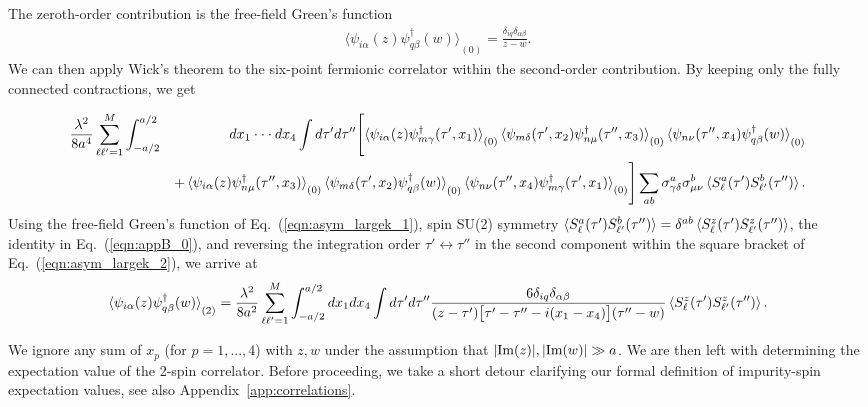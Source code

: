 \documentclass[aps,prb,twocolumn,superscriptaddress]{revtex4-1}
\begin{document}
The zeroth-order contribution is the free-field Green's function
\begin{eqnarray}
\bigl\langle{\psi_{i\alpha}(z)\psi_{q\beta}^{\dagger}(w)\bigr\rangle}_{(0)}=\frac{\delta_{iq}\delta_{\alpha\beta}}{z-w}. \label{eqn:asym_largek_1}
\end{eqnarray}
We can then apply Wick's theorem to the six-point fermionic correlator within the second-order contribution. By keeping only the fully connected contractions, we get 
\begin{widetext}
\begin{eqnarray}
\frac{\lambda^{2}}{8a^{4}}\sum_{\ell\ell'=1}^{M}\int_{-a/2}^{a/2}&&dx_{1}\cdot\cdot\cdot dx_{4}\int{d\tau'd\tau''}\Biggl[\braket{\psi_{i\alpha}(z)\psi_{m\gamma}^{\dagger}(\tau',x_{1})}_{(0)}\braket{\psi_{m\delta}(\tau',x_{2})\psi_{n\mu}^{\dagger}(\tau'',x_{3})}_{(0)}\braket{\psi_{n\nu}(\tau'',x_{4})\psi_{q\beta}^{\dagger}(w)}_{(0)} \label{eqn:asym_largek_2} \\
&&+\braket{\psi_{i\alpha}(z)\psi_{n\mu}^{\dagger}(\tau'',x_{3})}_{(0)}\braket{\psi_{m\delta}(\tau',x_{2})\psi_{q\beta}^{\dagger}(w)}_{(0)}\braket{\psi_{n\nu}(\tau'',x_{4})\psi_{m\gamma}^{\dagger}(\tau',x_{1})}_{(0)}\Biggr]\sum_{ab}\sigma^{a}_{\gamma\delta}\sigma^{b}_{\mu\nu}\braket{S_{\ell}^{a}(\tau')S_{\ell'}^{b}(\tau'')}. \nonumber
\end{eqnarray}
Using the free-field Green's function of Eq.~(\ref{eqn:asym_largek_1}), spin SU(2) symmetry $\braket{S_{\ell}^{a}(\tau')S_{\ell'}^{b}(\tau'')}=\delta^{ab} \braket{S_{\ell}^{z}(\tau')S_{\ell'}^{z}(\tau'')}$, the identity in Eq.~(\ref{eqn:appB_0}), and reversing the integration order $\tau'\leftrightarrow\tau''$ in the second component within the square bracket of Eq.~(\ref{eqn:asym_largek_2}), we arrive at
\begin{eqnarray}
\braket{\psi_{i\alpha}(z)\psi_{q\beta}^{\dagger}(w)}_{(2)}=\frac{\lambda^{2}}{8a^{2}}\sum_{\ell\ell'=1}^{M}\int_{-a/2}^{a/2}dx_{1}dx_{4}\int{d\tau'd\tau''}\frac{6\delta_{iq}\delta_{\alpha\beta}}{(z-\tau')\bigl[\tau'-\tau''-i(x_{1}-x_{4})\bigr](\tau''-w)}\braket{S_{\ell}^{z}(\tau')S_{\ell'}^{z}(\tau'')}. \label{eqn:asym_largek_3}
\end{eqnarray}
\end{widetext}
We ignore any sum of $x_{p}$ (for $p=1,...,4$) with $z,w$ under the assumption that $|\textup{Im}(z)|,|\textup{Im}(w)|\gg a$. We are then left with determining the expectation value of the 2-spin correlator. Before proceeding, we take a short detour clarifying our formal definition of impurity-spin expectation values, see also Appendix~\ref{app:correlations}.
\end{document}
